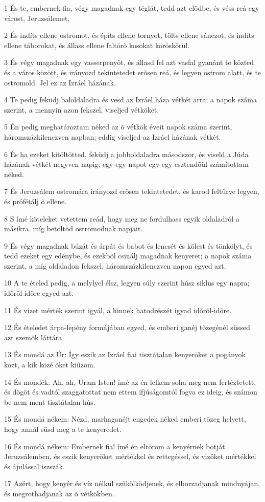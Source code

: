 \par 1 És te, embernek fia, végy magadnak egy téglát, tedd azt elõdbe, és véss reá egy várost, Jeruzsálemet,
\par 2 És indíts ellene ostromot, és építs ellene tornyot, tölts ellene sánczot, és indíts ellene táborokat, és állass ellene faltörõ kosokat köröskörül.
\par 3 És végy magadnak egy vasserpenyõt, és állasd fel azt vasfal gyanánt te közted és a város között, és irányozd tekintetedet erõsen reá, és legyen ostrom alatt, és te ostromold. Jel ez az Izráel házának.
\par 4 Te pedig feküdj baloldaladra és vesd az Izráel háza vétkét arra; a napok száma szerint, a mennyin azon fekszel, viseljed vétköket.
\par 5 Én pedig meghatároztam néked az õ vétkök éveit napok száma szerint, háromszázkilenczven napban; eddig viseljed az Izráel házának vétkét.
\par 6 És ha ezeket kitöltötted, feküdj a jobboldaladra másodszor, és viseld a Júda házának vétkét negyven napig; egy-egy napot egy-egy esztendõül számítottam néked.
\par 7 És Jeruzsálem ostromára irányozd erõsen tekintetedet, és karod feltûrve legyen, és prófétálj õ ellene.
\par 8 S ímé köteleket vetettem reád, hogy meg ne fordulhass egyik oldaladról a másikra. míg betöltöd ostromodnak napjait.
\par 9 És végy magadnak búzát és árpát és babot és lencsét és kölest és tönkölyt, és tedd ezeket egy edénybe, és ezekbõl csinálj magadnak kenyeret; a napok száma szerint, a míg oldaladon fekszel, háromszázkilenczven napon egyed azt.
\par 10 A te ételed pedig, a melylyel élsz, legyen súly szerint húsz siklus egy napra; idõrõl-idõre egyed azt.
\par 11 És vizet mérték szerint igyál, a hinnek hatodrészét igyad idõrõl-idõre.
\par 12 És ételedet árpa-lepény formájában egyed, és emberi ganéj tõzegénél süssed azt szemök láttára.
\par 13 És mondá az Úr: Így eszik az Izráel fiai tisztátalan kenyeröket a pogányok közt, a kik közé õket kiûzöm.
\par 14 És mondék: Ah, ah, Uram Isten! ímé az én lelkem soha meg nem fertéztetett, és dögöt és vadtól szaggatottat nem ettem ifjúságomtól fogva ez ideig, és számon be nem ment tisztátalan hús.
\par 15 És mondá nékem: Nézd, marhaganéjt engedek néked emberi tõzeg helyett, hogy annál süsd meg a te kenyeredet.
\par 16 És mondá nékem: Embernek fia! ímé én eltöröm a kenyérnek botját Jeruzsálemben, és eszik kenyeröket mértékkel és rettegéssel, és vizöket mértékkel és ájulással iszszák.
\par 17 Azért, hogy kenyér és víz nélkül szûkölködjenek, és elborzadjanak mindnyájan, és megrothadjanak az õ  vétkökben.

